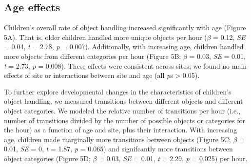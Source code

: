 \documentclass[10pt, letterpaper]{article}
\begin{document}
\hypertarget{age-effects}{%
\subsection{Age effects}\label{age-effects}}

Children's overall rate of object handling increased significantly with
age (Figure 5A). That is, older children handled more unique objects per
hour (\(\beta\) = 0.12, \emph{SE} = 0.04, \emph{t} = 2.78, \emph{p} =
0.007). Additionally, with increasing age, children handled more objects
from different categories per hour (Figure 5B; \(\beta\) = 0.03,
\emph{SE} = 0.01, \emph{t} = 2.73, \emph{p} = 0.008). These effects were
consistent across sites; we found no main effects of site or
interactions between site and age (all \emph{p}s \textgreater{} 0.05).

To further explore developmental changes in the characteristics of
children's object handling, we measured transitions between different
objects and different object categories. We modeled the relative number
of transitions per hour (i.e., number of transitions divided by the
number of possible objects or categories for the hour) as a function of
age and site, plus their interaction. With increasing age, children made
marginally more transitions between objects (Figure 5C; \(\beta\) =
0.01, \emph{SE} = 0, \emph{t} = 1.87, \emph{p} = 0.065) and signifcantly
more transitions between object categories (Figure 5D; \(\beta\) = 0.03,
\emph{SE} = 0.01, \emph{t} = 2.29, \emph{p} = 0.025) per hour.
\end{document}

